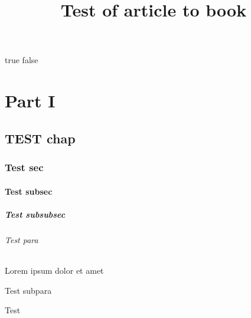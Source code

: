 \documentclass{article}
\title{Test of article to book}
\begin{document}
\makeatletter
\if@openright true \else false \fi
\makeatother
    \tableofcontents
    
    
    \part{Part I}
    
    \chapter{TEST chap}
    \section{Test sec}
    \subsection{Test subsec}
    \subsubsection{Test subsubsec}
    \paragraph{Test para} Lorem ipsum dolor et amet
    \subparagraph{Test subpara}
    Test
\end{document}
